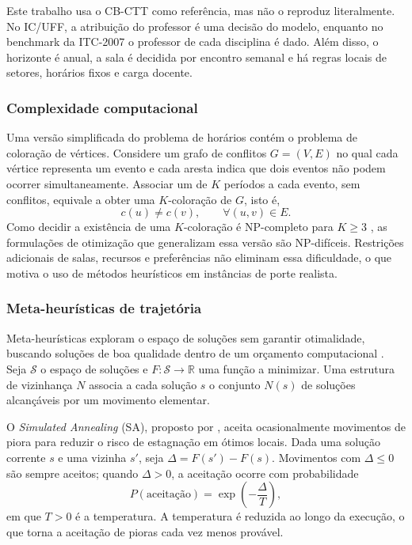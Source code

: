 Este trabalho usa o CB-CTT como referência, mas não o reproduz literalmente. No IC/UFF, a atribuição do professor é uma decisão do modelo, enquanto no benchmark da ITC-2007 o professor de cada disciplina é dado. Além disso, o horizonte é anual, a sala é decidida por encontro semanal e há regras locais de setores, horários fixos e carga docente.

\subsubsection{Complexidade computacional}

Uma versão simplificada do problema de horários contém o problema de coloração de vértices. Considere um grafo de conflitos $G=(V,E)$ no qual cada vértice representa um evento e cada aresta indica que dois eventos não podem ocorrer simultaneamente. Associar um de $K$ períodos a cada evento, sem conflitos, equivale a obter uma $K$-coloração de $G$, isto é,
\begin{equation}
  c(u)\neq c(v), \qquad \forall (u,v)\in E.
\end{equation}
Como decidir a existência de uma $K$-coloração é NP-completo para $K\geq 3$ \cite{garey1979computers}, as formulações de otimização que generalizam essa versão são NP-difíceis. Restrições adicionais de salas, recursos e preferências não eliminam essa dificuldade, o que motiva o uso de métodos heurísticos em instâncias de porte realista.

\subsubsection{Meta-heurísticas de trajetória}

Meta-heurísticas exploram o espaço de soluções sem garantir otimalidade, buscando soluções de boa qualidade dentro de um orçamento computacional \cite{talbi2009metaheuristics}. Seja $\mathcal{S}$ o espaço de soluções e $F:\mathcal{S}\rightarrow\mathbb{R}$ uma função a minimizar. Uma estrutura de vizinhança $N$ associa a cada solução $s$ o conjunto $N(s)$ de soluções alcançáveis por um movimento elementar.

O \textit{Simulated Annealing} (SA), proposto por , aceita ocasionalmente movimentos de piora para reduzir o risco de estagnação em ótimos locais. Dada uma solução corrente $s$ e uma vizinha $s'$, seja $\Delta=F(s')-F(s)$. Movimentos com $\Delta\leq 0$ são sempre aceitos; quando $\Delta>0$, a aceitação ocorre com probabilidade
\begin{equation}
  P(\text{aceitação})=\exp\left(-\frac{\Delta}{T}\right),
  \label{eq:metropolis}
\end{equation}
em que $T>0$ é a temperatura. A temperatura é reduzida ao longo da execução, o que torna a aceitação de pioras cada vez menos provável.

